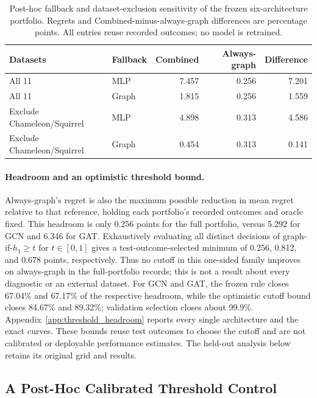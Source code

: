 \begin{table}[ht]
\centering
\caption{Post-hoc fallback and dataset-exclusion sensitivity of the frozen six-architecture portfolio. Regrets and Combined-minus-always-graph differences are percentage points. All entries reuse recorded outcomes; no model is retrained.}
\label{tab:fallback_sensitivity}
\small
\begin{tabular}{@{}llrrr@{}}
\toprule
Datasets & Fallback & Combined & Always-graph & Difference \\
\midrule
All 11 & MLP & 7.457 & 0.256 & 7.201 \\
All 11 & Graph & 1.815 & 0.256 & 1.559 \\
Exclude Chameleon/Squirrel & MLP & 4.898 & 0.313 & 4.586 \\
Exclude Chameleon/Squirrel & Graph & 0.454 & 0.313 & 0.141 \\
\bottomrule
\end{tabular}
\end{table}

\paragraph{Headroom and an optimistic threshold bound.}
Always-graph's regret is also the maximum possible reduction in mean regret relative to that reference, holding each portfolio's recorded outcomes and oracle fixed. This headroom is only 0.256 points for the full portfolio, versus 5.292 for GCN and 6.346 for GAT. Exhaustively evaluating all distinct decisions of graph-if-$h_1\geq t$ for $t\in[0,1]$ gives a test-outcome-selected minimum of 0.256, 0.812, and 0.678 points, respectively. Thus no cutoff in this one-sided family improves on always-graph in the full-portfolio records; this is not a result about every diagnostic or an external dataset. For GCN and GAT, the frozen rule closes 67.04\% and 67.17\% of the respective headroom, while the optimistic cutoff bound closes 84.67\% and 89.32\%; validation selection closes about 99.9\%. Appendix~\ref{app:threshold_headroom} reports every single architecture and the exact curves. These bounds reuse test outcomes to choose the cutoff and are not calibrated or deployable performance estimates. The held-out analysis below retains its original grid and results.

\subsection{A Post-Hoc Calibrated Threshold Control}
\label{sec:calibrated_threshold}

